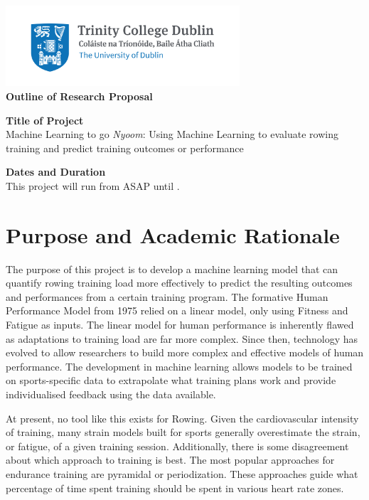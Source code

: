 \begin{center}
    \includegraphics[height=3cm]{info-sheet/Trinity_RGB_transparent_main.png}\\
    {\Large\textbf{Outline of Research Proposal}}
\end{center}

\textbf{Title of Project}\\
Machine Learning to go \textit{Nyoom}: Using Machine Learning to evaluate rowing training and predict training outcomes or performance

\textbf{Dates and Duration}\\
This project will run from ASAP until \deadline.

\section*{Purpose and Academic Rationale}
The purpose of this project is to develop a machine learning model that can quantify rowing training load more effectively to predict the resulting outcomes and performances from a certain training program. The formative Human Performance Model from 1975 relied on a linear model, only using Fitness and Fatigue as inputs. The linear model for human performance is inherently flawed as adaptations to training load are far more complex. Since then, technology has evolved to allow researchers to build more complex and effective models of human performance. The development in machine learning allows models to be trained on sports-specific data to extrapolate what training plans work and provide individualised feedback using the data available.

At present, no tool like this exists for Rowing. Given the cardiovascular intensity of training, many strain models built for sports generally overestimate the strain, or fatigue, of a given training session. Additionally, there is some disagreement about which approach to training is best. The most popular approaches for endurance training are pyramidal or periodization. These approaches guide what percentage of time spent training should be spent in various heart rate zones.


